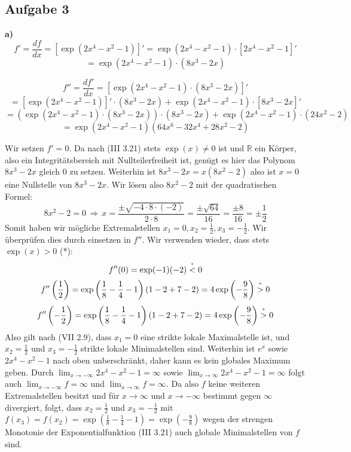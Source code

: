 \documentclass[a4paper,graphics,11pt]{article}
\newcommand{\aufgabe}[1]{\subsection*{Aufgabe #1}}
\newcommand{\up}[2]{\mathrel{\overset{\makebox[0pt]{\mbox{\normalfont\tiny #2}}}{#1}}}
\begin{document}
\newpage

\aufgabe{3}

\textbf{a)}
$$
    f' = \frac{df}{dx} = \left[\exp(2x^4-x^2-1)\right]'
    = \exp(2x^4-x^2-1)\cdot \left[2x^4-x^2-1\right]'
$$$$
    = \exp(2x^4-x^2-1) \cdot (8x^3-2x)
$$

$$
    f'' = \frac{df'}{dx} = \left[\exp(2x^4-x^2-1)\cdot (8x^3-2x)\right]'
$$$$
    = [\exp(2x^4-x^2-1)]'\cdot(8x^3-2x) + \exp(2x^4-x^2-1)\cdot[8x^3-2x]'
$$$$
    = \left(\exp(2x^4-x^2-1) \cdot (8x^3-2x)\right) \cdot(8x^3-2x) + \exp(2x^4-x^2-1)\cdot(24x^2-2)
$$$$
    = \exp(2x^4-x^2-1)(64x^6-32x^4+28x^2-2)
$$

Wir setzen $f'=0$. Da nach (III 3.21) stets $\exp(x) \neq 0$ ist und $\mathbb{R}$ ein Körper,
also ein Integritätsbereich mit Nullteilerfreiheit ist, genügt es hier das Polynom
$8x^3-2x$ gleich 0 zu setzen. Weiterhin ist $8x^3-2x = x(8x^2-2)$ also ist $x=0$ eine
Nullstelle von $8x^3-2x$. Wir lösen also $8x^2-2$ mit der quadratischen Formel:
$$
    8x^2-2 = 0
    \,\Longrightarrow\, x = \frac{\pm\sqrt{-4\cdot8\cdot(-2)}}{2\cdot 8}
    = \frac{\pm \sqrt{64}}{16} = \frac{\pm8}{16} = \pm \frac{1}{2}
$$
Somit haben wir mögliche Extremalstellen $x_1 = 0, x_2 = \frac{1}{2}, x_3 = - \frac{1}{2}$.
Wir überprüfen dies durch einsetzen in $f''$. Wir verwenden wieder, dass stets $\exp(x) > 0$ (*):
$$
    f''(0) = \exp(-1)(-2) \up{<}{*} 0
$$$$
    f''\left(\frac{1}{2}\right)
    = \exp\left(\frac{1}{8}- \frac{1}{4} -1\right)\left(1- 2 + 7 - 2\right)
    = 4\exp\left(-\frac{9}{8}\right) \up{>}{*} 0
$$$$
     f''\left(-\frac{1}{2}\right)
    = \exp\left(\frac{1}{8}- \frac{1}{4} -1\right)\left(1- 2 + 7 - 2\right)
    = 4\exp\left(-\frac{9}{8}\right) \up{>}{*} 0
$$
Also gilt nach (VII 2.9), dass $x_1 = 0$ eine strikte lokale Maximalstelle ist,
und $x_2=\frac{1}{2}$ und $x_3 = - \frac{1}{2}$ strikte lokale Minimalstellen sind.
Weiterhin ist $e^x$ sowie $2x^4-x^2-1$ nach oben unberschränkt, daher kann es kein
globales Maximum geben. Durch $\lim_{x \to -\infty}\limits 2x^4-x^2-1 = \infty$ sowie
$\lim_{x \to \infty}\limits 2x^4-x^2-1 = \infty$ folgt auch $\lim_{x \to -\infty}\limits
f = \infty$ und $\lim_{x \to \infty}\limits f = \infty$. Da also $f$ keine weiteren
Extremalstellen besitzt und für $x\to \infty$ und $x\to -\infty$ bestimmt gegen $\infty$ 
divergiert, folgt, dass $x_2 = \frac{1}{2}$ und $x_3 = -\frac{1}{2}$
mit $f(x_3) = f(x_2) = \exp\left(\frac{1}{8}-\frac{1}{4} -1\right)
= \exp\left(-\frac{9}{8}\right)$ wegen der strengen Monotonie der Exponentialfunktion
(III 3.21) auch globale Minimalstellen von $f$ sind.
\end{document}
